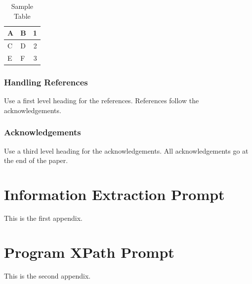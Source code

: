 \documentclass[a4paper]{article}
\begin{document}
\begin{table}[ht]
\begin{center}
\caption{Sample Table}

\bigskip

\begin{tabular}{|l|l|r|}
\hline
A & B & 1\\ \hline
C & D & 2\\
E & F & 3\\ \hline
\end{tabular}
\end{center}
\end{table}


\subsubsection{Handling References}

Use a first level heading for the references. References follow the
acknowledgements.


\subsubsection{Acknowledgements}

Use a third level heading for the acknowledgements. All acknowledgements
go at the end of the paper.


% 
{}


\appendix

\section{Information Extraction Prompt}
This is the first appendix.

\section{Program XPath Prompt}
This is the second appendix.
\end{document}
